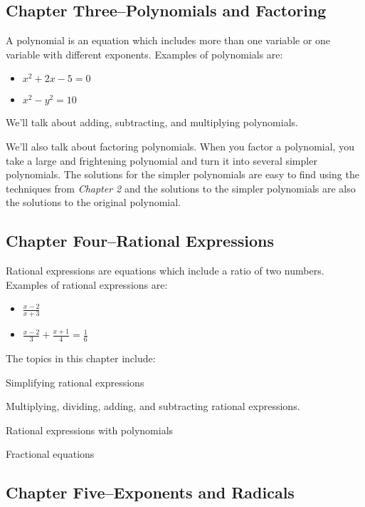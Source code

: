 \documentclass{article}
\begin{document}
  \subsection{Chapter Three--Polynomials and Factoring}

  A polynomial is an equation which includes more than one variable or one variable with different exponents.  Examples of
  polynomials are:
  \begin{itemize}
    \item \(x^2 + 2x -5 = 0\)
    \item \(x^2 - y^2 = 10 \)
  \end{itemize}

  We'll talk about adding, subtracting, and multiplying polynomials.

  We'll also talk about factoring polynomials.  When you factor a polynomial, you take a large and frightening
  polynomial and turn it into several simpler polynomials.  The solutions for the simpler polynomials are easy to find
  using the techniques from {\em Chapter 2} and the solutions to the simpler polynomials are also the solutions to the
  original polynomial.

  \subsection{Chapter Four--Rational Expressions}

  Rational expressions are equations which include a ratio of two numbers.  Examples of rational expressions are:

  \begin{itemize}
    \item \( \frac{x - 2}{x + 3} \)
    \item \( \frac{x - 2}{3} + \frac{x + 1}{4} = \frac{1}{6} \)
  \end{itemize}

  The topics in this chapter include:

  \begin{itemize*}
    \item Simplifying rational expressions
    \item Multiplying, dividing, adding, and subtracting rational expressions.
    \item Rational expressions with polynomials
    \item Fractional equations
  \end{itemize*}

  \subsection{Chapter Five--Exponents and Radicals}
\end{document}
